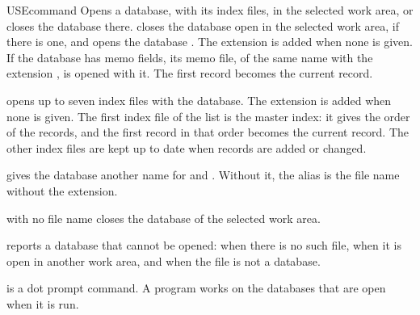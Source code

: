 \begin{XbaseEntry}{USE}{command}
Opens a database, with its index files, in the selected work area, or closes
the database there.
\Syntax
{}
\Usage
{}  closes the database open in the selected work area, if
there is one, and opens the database .  The extension  is
added when none is given.  If the database has memo fields, its memo file, of
the same name with the extension , is opened with it.  The first
record becomes the current record.

 opens up to seven index files with the database.  The extension
 is added when none is given.  The first index file of the list is
the master index: it gives the order of the records, and the first record in
that order becomes the current record.  The other index files are kept up to
date when records are added or changed.

 gives the database another name for  and .
Without it, the alias is the file name without the extension.

 with no file name closes the database of the selected work area.

 reports a database that cannot be opened:  when there is no such file,  when it is
open in another work area, and  when the file
is not a database.

 is a dot prompt command.  A program works on the databases that are
open when it is run.
\Examples
{}
\end{XbaseEntry}

